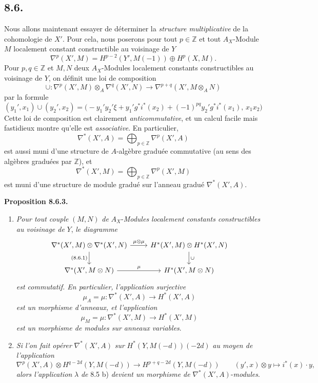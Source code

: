 \documentclass[11pt]{article}
\newenvironment{statement}[1]{\par\medskip\noindent\textbf{#1.}\ }{\par\medskip}
\begin{document}
\subsection*{8.6.}

Nous allons maintenant essayer de déterminer la \emph{structure multiplicative} de la cohomologie de $X'$. Pour cela, nous poserons pour tout $p\in\mathbb Z$ et tout $A_X$-Module $M$ localement constant constructible au voisinage de $Y$
\[
\nabla^p(X',M)=H^{p-2}(Y',M(-1))\oplus H^p(X,M).
\]
Pour $p,q\in\mathbb Z$ et $M,N$ deux $A_X$-Modules localement constants constructibles au voisinage de $Y$, on définit une loi de composition
\[
\cup:\nabla^p(X',M)\otimes_A\nabla^q(X',N)\to
\nabla^{p+q}(X',M\otimes_A N)
\tag{8.6.1}
\]
par la formule
\[
(y_1',x_1)\cup(y_2',x_2)=
\bigl(-y_1'y_2'\xi+y_1'g^*i^*(x_2)+(-1)^{pq}y_2'g^*i^*(x_1),\,x_1x_2\bigr)
\tag{8.6.2}
\]
Cette loi de composition est clairement \emph{anticommutative}, et un calcul facile mais fastidieux montre qu'elle est \emph{associative}. En particulier,
\[
\nabla^*(X',A)=\bigoplus_{p\in\mathbb Z}\nabla^p(X',A)
\]
est
aussi muni d'une structure de $A$-algèbre graduée commutative (au sens des algèbres graduées par $\mathbb Z$), et
\[
\nabla^*(X',M)=\bigoplus_{p\in\mathbb Z}\nabla^p(X',M)
\]
est muni d'une structure de module gradué sur l'anneau gradué $\nabla^*(X',A)$.

\begin{statement}{Proposition 8.6.3}
\begin{enumerate}[label=\alph*)]
\item \emph{Pour tout couple} $(M,N)$ \emph{de} $A_X$-\emph{Modules localement constants constructibles au voisinage de} $Y$, \emph{le diagramme}
\[
\begin{tikzcd}
\nabla^*(X',M)\otimes\nabla^*(X',N)\arrow[r,"\mu\otimes\mu"]\arrow[d,"{(8.6.1)}"']&
H^*(X',M)\otimes H^*(X',N)\arrow[d,"\cup"]\\
\nabla^*(X',M\otimes N)\arrow[r,"\mu"]&
H^*(X',M\otimes N)
\end{tikzcd}
\]
\emph{est commutatif. En particulier, l'application surjective}
\[
\mu_A=\mu:\nabla^*(X',A)\to H^*(X',A)
\]
\emph{est un morphisme d'anneaux, et l'application}
\[
\mu_M=\mu:\nabla^*(X',M)\to H^*(X',M)
\]
\emph{est un morphisme de modules sur anneaux variables}.
\item \emph{Si l'on fait opérer} $\nabla^*(X',A)$ \emph{sur} $H^*(Y,M(-d))(-2d)$ \emph{au moyen de l'application}
\[
\nabla^p(X',A)\otimes H^{q-2d}(Y,M(-d))
\to H^{p+q-2d}(Y,M(-d))
\qquad
(y',x)\otimes y\mapsto i^*(x)\cdot y,
\]
\emph{alors l'application} $\lambda$ \emph{de} 8.5 b) \emph{devient un morphisme de} $\nabla^*(X',A)$-\emph{modules}.
\end{enumerate}
\end{statement}
\end{document}
